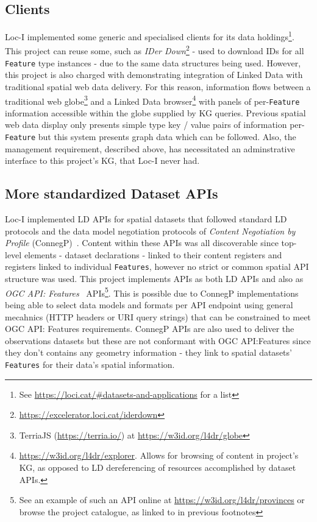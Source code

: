 \documentclass[runningheads]{llncs}
\begin{document}
\subsection{Clients}
Loc-I implemented some generic and specialised clients for its data holdings\footnote{See \url{https://loci.cat/\#datasets-and-applications} for a list}. This project can reuse some, such as 
\textit{IDer Down}\footnote{\url{https://excelerator.loci.cat/iderdown}} - used to download IDs for all \texttt{Feature} type instances - due to the same data structures being used.
However, this project is also charged with demonstrating integration of Linked Data with traditional spatial web data delivery. For this reason, information
flows between a traditional web globe\footnote{TerriaJS (\url{https://terria.io/}) at \url{https://w3id.org/l4dr/globe}}
and a Linked Data browser\footnote{\url{https://w3id.org/l4dr/explorer}. Allows for browsing of content in project's KG, as opposed to LD dereferencing of resources 
accomplished by dataset APIs.} with panels of per-\texttt{Feature} information accessible within the globe supplied by KG queries. Previous spatial web data display
only presents simple type key / value pairs of information per-\texttt{Feature} but this system presents graph data which can be followed. Also, the management requirement, described above, has 
necessitated an adminstrative interface to this project's KG, that Loc-I never had.

\subsection{More standardized Dataset APIs}
Loc-I implemented LD APIs for spatial datasets that followed standard LD protocols and the data model negotiation protocols of \textit{Content Negotiation by Profile} (ConnegP)~\cite{atkinson_profiles_2020}.
Content within these APIs was all discoverable since top-level elements - dataset declarations - linked to their content registers and registers linked to individual \texttt{Features}, 
however no strict or common spatial API structure was used. This project implements APIs as both LD APIs and also as \textit{OGC API: Features}~\cite{clemens_portele_ogc_2019} APIs\footnote{See an example of such an API online at \url{https://w3id.org/l4dr/provinces} or browse the project catalogue, as linked to in previous footnotes}.
This is possible due to ConnegP implementations being able to select data models and formats per API endpoint using general mecahnics (HTTP headers or URI query strings) that can be constrained
to meet OGC API: Features requirements. ConnegP APIs are also used to deliver the observations datasets but these are not conformant with OGC API:Features since they don't contains any geometry 
information - they link to spatial datasets' \texttt{Features} for their data's spatial information.
\end{document}
